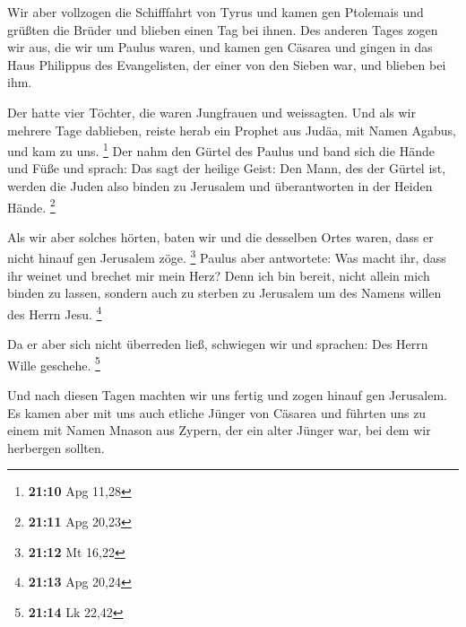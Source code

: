  Wir aber vollzogen die Schifffahrt von Tyrus und kamen gen
Ptolemais und grüßten die Brüder und blieben einen Tag bei ihnen.
 Des anderen Tages zogen wir aus, die wir um Paulus waren,
und kamen gen Cäsarea und gingen in das Haus Philippus des Evangelisten,
der einer von den Sieben war, und blieben bei ihm.

 Der hatte vier Töchter, die waren Jungfrauen und
weissagten.  Und als wir mehrere Tage dablieben, reiste
herab ein Prophet aus Judäa, mit Namen Agabus, und kam zu uns.
\footnote{\textbf{21:10} Apg 11,28}  Der nahm den Gürtel
des Paulus und band sich die Hände und Füße und sprach: Das sagt der
heilige Geist: Den Mann, des der Gürtel ist, werden die Juden also
binden zu Jerusalem und überantworten in der Heiden Hände. \footnote{\textbf{21:11}
  Apg 20,23}

 Als wir aber solches hörten, baten wir und die desselben
Ortes waren, dass er nicht hinauf gen Jerusalem zöge. \footnote{\textbf{21:12}
  Mt 16,22}  Paulus aber antwortete: Was macht ihr, dass
ihr weinet und brechet mir mein Herz? Denn ich bin bereit, nicht allein
mich binden zu lassen, sondern auch zu sterben zu Jerusalem um des
Namens willen des Herrn Jesu. \footnote{\textbf{21:13} Apg 20,24}

 Da er aber sich nicht überreden ließ, schwiegen wir und
sprachen: Des Herrn Wille geschehe. \footnote{\textbf{21:14} Lk 22,42}

 Und nach diesen Tagen machten wir uns fertig und zogen
hinauf gen Jerusalem.  Es kamen aber mit uns auch etliche
Jünger von Cäsarea und führten uns zu einem mit Namen Mnason aus Zypern,
der ein alter Jünger war, bei dem wir herbergen sollten.

